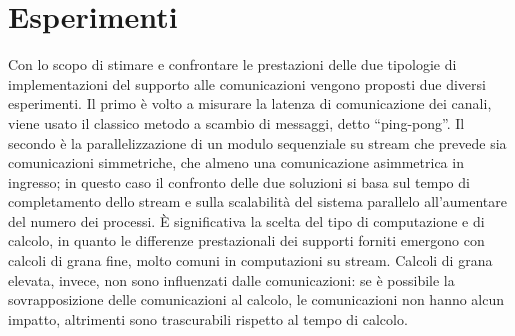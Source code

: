 \section{Esperimenti}
\label{sct:esperimenti}
Con lo scopo di stimare e confrontare le prestazioni delle due tipologie di implementazioni del supporto alle comunicazioni vengono proposti due diversi esperimenti. Il primo \`e volto a misurare la latenza di comunicazione dei canali, viene usato il classico metodo a scambio di messaggi, detto ``ping-pong''. Il secondo \`e la parallelizzazione di un modulo sequenziale su stream che prevede sia comunicazioni simmetriche, che almeno una comunicazione asimmetrica in ingresso; in questo caso il confronto delle due soluzioni si basa sul tempo di completamento dello stream e sulla scalabilit\`a del sistema parallelo all'aumentare del numero dei processi. \`E significativa la scelta del tipo di computazione e di calcolo, in quanto le differenze prestazionali dei supporti forniti emergono con calcoli di grana fine, molto comuni in computazioni su stream. Calcoli di grana elevata, invece, non sono influenzati dalle comunicazioni: se \`e possibile la sovrapposizione delle comunicazioni al calcolo, le comunicazioni non hanno alcun impatto, altrimenti sono trascurabili rispetto al tempo di calcolo.






\null
\vfill
\newpage



